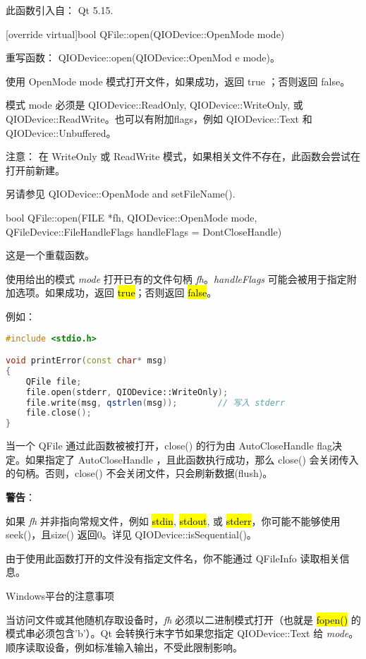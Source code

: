 此函数引入自： Qt 5.15.

[override virtual]bool QFile::open(QIODevice::OpenMode mode)

重写函数： QIODevice::open(QIODevice::OpenMod
e mode)。

使用 OpenMode mode 模式打开文件，如果成功，返回 true ；否则返回 false。

模式 mode 必须是 QIODevice::ReadOnly, QIODevice::WriteOnly, 或 QIODevice::ReadWrite。也可以有附加flags，例如 QIODevice::Text 和 QIODevice::Unbuffered。

注意： 在 WriteOnly 或 ReadWrite 模式，如果相关文件不存在，此函数会尝试在打开前新建。

另请参见 QIODevice::OpenMode and setFileName().

bool QFile::open(FILE *fh, QIODevice::OpenMode mode, QFileDevice::FileHandleFlags handleFlags = DontCloseHandle)

这是一个重载函数。

使用给出的模式 \emph{mode} 打开已有的文件句柄 \emph{fh}。\emph{handleFlags} 可能会被用于指定附加选项。如果成功，返回 \hl{true}；否则返回 \hl{false}。

例如：


\begin{lstlisting}[language=C++]
#include <stdio.h>

void printError(const char* msg)
{
    QFile file;
    file.open(stderr, QIODevice::WriteOnly);
    file.write(msg, qstrlen(msg));        // 写入 stderr
    file.close();
}
\end{lstlisting}

当一个 QFile 通过此函数被被打开，close() 的行为由 AutoCloseHandle flag决定。如果指定了 AutoCloseHandle ，且此函数执行成功，那么 close() 会关闭传入的句柄。否则，close() 不会关闭文件，只会刷新数据(flush)。

\textbf{警告}：

\begin{compactitem}
\item 如果 \emph{fh} 并非指向常规文件，例如 \hl{stdin}, \hl{stdout}, 或 \hl{stderr}，你可能不能够使用 seek()，且size() 返回0。详见 QIODevice::isSequential()。
\item 由于使用此函数打开的文件没有指定文件名，你不能通过 QFileInfo 读取相关信息。
\end{compactitem}

Windows平台的注意事项

当访问文件或其他随机存取设备时，\emph{fh} 必须以二进制模式打开（也就是
\hl{fopen()} 的模式串必须包含'b'）。Qt 会转换行末字节如果您指定
QIODevice::Text 给 \emph{
mode}。顺序读取设备，例如标准输入输出，不受此限制影响。

